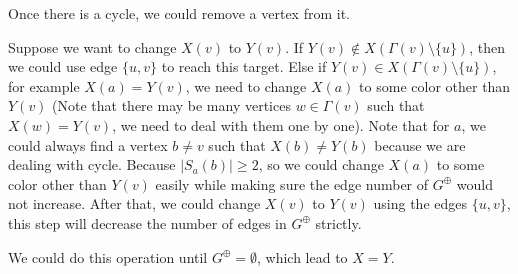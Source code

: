 \documentclass{article}
\begin{document}
\begin{tcolorbox}[title=Break cycles in $G^\oplus$]
  Once there is a cycle, we could remove a vertex from it.
  \begin{center}
  \end{center}
  \tcblower
  Suppose we want to change $X(v)$ to $Y(v)$. If $Y(v)\not\in X(\Gamma(v)\setminus\{u\})$, then we could use edge $\{u, v\}$ to reach this target. Else if $Y(v)\in X(\Gamma(v)\setminus\{u\})$, for example $X(a) = Y(v)$, we need to change $X(a)$ to some color other than $Y(v)$ (\textcolor[rgb]{0,0,1}{Note that there may be many vertices $w\in \Gamma(v)$ such that $X(w) = Y(v)$, we need to deal with them one by one}). Note that for $a$, we could always find a vertex $b\not=v$ such that $X(b)\not=Y(b)$ because we are dealing with cycle. Because $|S_a(b)| \geq 2$, so we could change $X(a)$ to some color other than $Y(v)$ easily while making sure the edge number of $G^\oplus$ would not increase. After that, we could change $X(v)$ to $Y(v)$ using the edges $\{u, v\}$, this step will decrease the number of edges in $G^\oplus$ strictly.
\end{tcolorbox}
We could do this operation until $G^\oplus = \emptyset$, which lead to $X = Y$.
\end{document}
